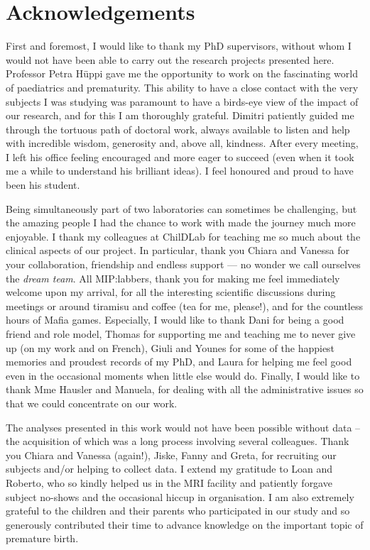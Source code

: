 \chapter*{Acknowledgements}
\lipsum[1-2]

\bigskip

First and foremost, I would like to thank my PhD supervisors, without whom I would not have been able to carry out the research projects presented here. Professor Petra Hüppi gave me the opportunity to work on the fascinating world of paediatrics and prematurity. This ability to have a close contact with the very subjects I was studying was paramount to have a birds-eye view of the impact of our research, and for this I am thoroughly grateful. Dimitri patiently guided me through the tortuous path of doctoral work, always available to listen and help with incredible wisdom, generosity and, above all, kindness. After every meeting, I left his office feeling encouraged and more eager to succeed (even when it took me a while to understand his brilliant ideas). I feel honoured and proud to have been his student.   

Being simultaneously part of two laboratories can sometimes be challenging, but the amazing people I had the chance to work with made the journey much more enjoyable. I thank my colleagues at ChilDLab for teaching me so much about the clinical aspects of our project. In particular, thank you Chiara and Vanessa for your collaboration, friendship and endless support --- no wonder we call ourselves the \textit{dream team}. All MIP:labbers, thank you for making me feel immediately welcome upon my arrival, for all the interesting scientific discussions during meetings or around tiramisu and coffee (tea for me, please!), and for the countless hours of Mafia games. Especially, I would like to thank Dani for being a good friend and role model, Thomas for supporting me and teaching me to never give up (on my work and on French), Giuli and Younes for some of the happiest memories and proudest records of my PhD, and Laura for helping me feel good even in the occasional moments when little else would do.  Finally, I would like to thank Mme Hausler and Manuela, for dealing with all the administrative issues so that we could concentrate on our work.

The analyses presented in this work would not have been possible without data – the acquisition of which was a long process involving several colleagues. Thank you Chiara and Vanessa (again!), Jiske, Fanny and Greta, for recruiting our subjects and/or helping to collect data. I extend my gratitude to Loan and Roberto, who so kindly helped us in the MRI facility and patiently forgave subject no-shows and the occasional hiccup in organisation. I am also extremely grateful to the children and their parents who participated in our study and so generously contributed their time to advance knowledge on the important topic of premature birth.

